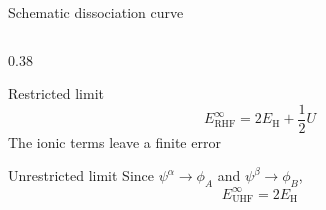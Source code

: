 \documentclass[aspectratio=169,9pt]{beamer}
\begin{document}
\begin{frame}{Schematic dissociation curve}
\begin{columns}[T,onlytextwidth]
\begin{column}{0.38\textwidth}
			\begin{block}{Restricted limit}
				\begin{equation*}
					\boxed{
						E_\text{RHF}^{\infty}
						=2E_\text{H}+\frac12 U
					}
				\end{equation*}
				The ionic terms leave a finite error
			\end{block}

			\begin{block}{Unrestricted limit}
				Since $\psi^\alpha\to\phi_A$ and $\psi^\beta\to\phi_B$,
				\begin{equation*}
					\boxed{E_\text{UHF}^{\infty}=2E_\text{H}}
				\end{equation*}
			\end{block}
		\end{column}
	\end{columns}
\end{frame}
\end{document}
